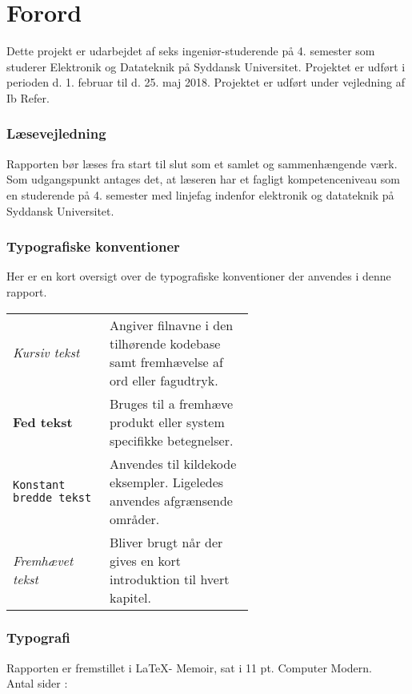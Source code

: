 \chapter*{Forord}\label{chap:forord}
Dette projekt er udarbejdet af seks ingeniør-studerende på 4. semester som studerer Elektronik og Datateknik på Syddansk Universitet. 
Projektet er udført i perioden d. 1. februar til d. 25. maj 2018. 
Projektet er udført under vejledning af Ib Refer.

\subsection{Læsevejledning}
Rapporten bør læses fra start til slut som et samlet og sammenhængende værk. 
Som udgangspunkt antages det, at læseren har et fagligt kompetenceniveau som en studerende på 4. semester med linjefag indenfor elektronik og datateknik på Syddansk Universitet.

\subsection{Typografiske konventioner}
Her er en kort oversigt over de typografiske konventioner der anvendes i denne rapport.

\bigskip

\begin{tabular}{l p{0.6\linewidth}}
	\textit{Kursiv tekst}			& Angiver filnavne i den tilhørende kodebase samt fremhævelse af ord eller fagudtryk. \\
	\textbf{Fed tekst}				& Bruges til a fremhæve produkt eller system specifikke betegnelser.\\
	\texttt{Konstant bredde tekst}	& Anvendes til kildekode eksempler. Ligeledes anvendes afgrænsende områder.\\
	\emph{Fremhævet tekst}		    & Bliver brugt når der gives en kort introduktion til hvert kapitel.\\
\end{tabular}

\subsection{Typografi}
Rapporten er fremstillet i \LaTeX - Memoir, sat i 11 pt. Computer Modern.\\
Antal sider : \pageref{LastPage}